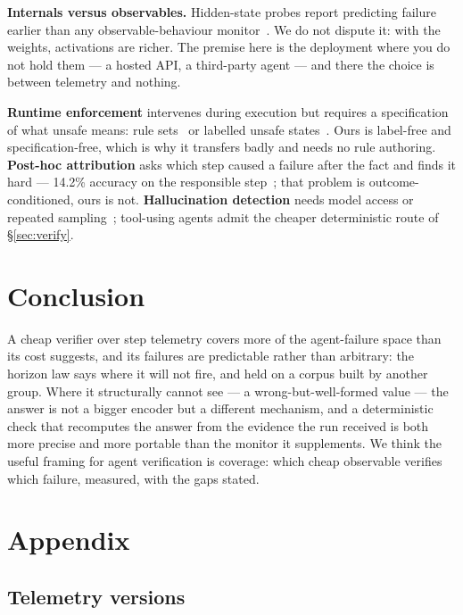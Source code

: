 \documentclass{article}
\begin{document}
\textbf{Internals versus observables.} Hidden-state probes report predicting
failure earlier than any observable-behaviour monitor~\cite{ruan2026doomed}. We
do not dispute it: with the weights, activations are richer. The premise here is
the deployment where you do not hold them --- a hosted API, a third-party agent
--- and there the choice is between telemetry and nothing.

\textbf{Runtime enforcement} intervenes during execution but requires a
specification of what unsafe means: rule sets~\cite{wang2025agentspec} or
labelled unsafe states~\cite{wang2025probguard}. Ours is label-free and
specification-free, which is why it transfers badly and needs no rule authoring.
\textbf{Post-hoc attribution} asks which step caused a failure after the fact
and finds it hard --- 14.2\% accuracy on the responsible
step~\cite{zhang2025which}; that problem is outcome-conditioned, ours is not.
\textbf{Hallucination detection} needs model access or repeated
sampling~\cite{manakul2023selfcheckgpt,farquhar2024detecting}; tool-using agents
admit the cheaper deterministic route of \S\ref{sec:verify}.

\section{Conclusion}

A cheap verifier over step telemetry covers more of the agent-failure space than
its cost suggests, and its failures are predictable rather than arbitrary: the
horizon law says where it will not fire, and held on a corpus built by another
group. Where it structurally cannot see --- a wrong-but-well-formed value ---
the answer is not a bigger encoder but a different mechanism, and a
deterministic check that recomputes the answer from the evidence the run
received is both more precise and more portable than the monitor it
supplements. We think the useful framing for agent verification is coverage:
which cheap observable verifies which failure, measured, with the gaps stated.




\appendix
\section{Appendix}

\subsection{Telemetry versions}
\end{document}
